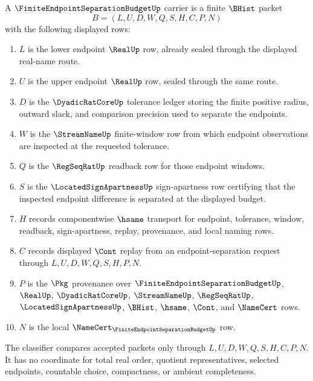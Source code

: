 \begin{definition}
\label{def:finite-endpoint-separation-budget-carrier}
A $\FiniteEndpointSeparationBudgetUp$ carrier is a finite $\BHist$ packet
$$
B=(L,U,D,W,Q,S,H,C,P,N)
$$
with the following displayed rows:
\begin{enumerate}
\item $L$ is the lower endpoint $\RealUp$ row, already sealed through the displayed real-name route.
\item $U$ is the upper endpoint $\RealUp$ row, sealed through the same route.
\item $D$ is the $\DyadicRatCoreUp$ tolerance ledger storing the finite positive radius, outward slack, and comparison precision used to separate the endpoints.
\item $W$ is the $\StreamNameUp$ finite-window row from which endpoint observations are inspected at the requested tolerance.
\item $Q$ is the $\RegSeqRatUp$ readback row for those endpoint windows.
\item $S$ is the $\LocatedSignApartnessUp$ sign-apartness row certifying that the inspected endpoint difference is separated at the displayed budget.
\item $H$ records componentwise $\hsame$ transport for endpoint, tolerance, window, readback, sign-apartness, replay, provenance, and local naming rows.
\item $C$ records displayed $\Cont$ replay from an endpoint-separation request through $L,U,D,W,Q,S,H,P,N$.
\item $P$ is the $\Pkg$ provenance over $\FiniteEndpointSeparationBudgetUp$, $\RealUp$, $\DyadicRatCoreUp$, $\StreamNameUp$, $\RegSeqRatUp$, $\LocatedSignApartnessUp$, $\BHist$, $\hsame$, $\Cont$, and $\NameCert$ rows.
\item $N$ is the local $\NameCert_{\FiniteEndpointSeparationBudgetUp}$ row.
\end{enumerate}
The classifier compares accepted packets only through $L,U,D,W,Q,S,H,C,P,N$. It has no coordinate for total real order, quotient representatives, selected endpoints, countable choice, compactness, or ambient completeness.
\end{definition}

